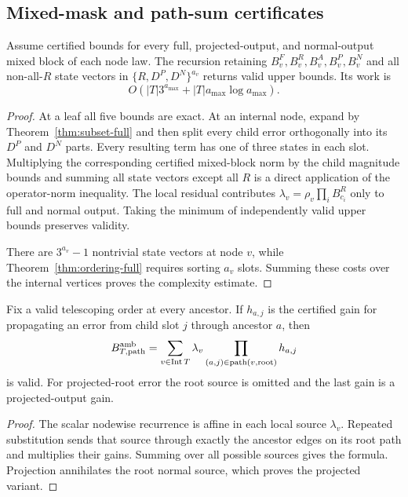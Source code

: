 \subsection{Mixed-mask and path-sum certificates}

\begin{theorem}
\label{thm:dp-full}
Assume certified bounds for every full, projected-output, and normal-output
mixed block of each node law. The recursion retaining
\(B_v^F,B_v^R,B_v^A,B_v^P,B_v^N\) and all non-all-\(R\) state vectors in
\(\{R,D^P,D^N\}^{a_v}\) returns valid upper bounds. Its work is
\[
 O\!\left(|T|3^{a_{\max}}+|T|a_{\max}\log a_{\max}\right).
\]
\end{theorem}

\begin{proof}
At a leaf all five bounds are exact. At an internal node, expand by
Theorem~\ref{thm:subset-full} and then split every child error orthogonally
into its \(D^P\) and \(D^N\) parts. Every resulting term has one of three
states in each slot. Multiplying the corresponding certified mixed-block
norm by the child magnitude bounds and summing all state vectors except
all \(R\) is a direct application of the operator-norm inequality. The
local residual contributes
\(\lambda_v=\rho_v\prod_iB_{c_i}^R\) only to full and normal output. Taking
the minimum of independently valid upper bounds preserves validity.

There are \(3^{a_v}-1\) nontrivial state vectors at node \(v\), while
Theorem~\ref{thm:ordering-full} requires sorting \(a_v\) slots. Summing
these costs over the internal vertices proves the complexity estimate.
\end{proof}

\begin{corollary}
\label{cor:path-full}
Fix a valid telescoping order at every ancestor. If \(h_{a,j}\) is the
certified gain for propagating an error from child slot \(j\) through
ancestor \(a\), then
\[
 B_{T,\rm path}^{\rm amb}
 =\sum_{v\in\operatorname{Int}T}\lambda_v
   \prod_{(a,j)\in\operatorname{path}(v,\operatorname{root})}h_{a,j}
\]
is valid. For projected-root error the root source is omitted and the last
gain is a projected-output gain.
\end{corollary}

\begin{proof}
The scalar nodewise recurrence is affine in each local source
\(\lambda_v\). Repeated substitution sends that source through exactly the
ancestor edges on its root path and multiplies their gains. Summing over
all possible sources gives the formula. Projection annihilates the root
normal source, which proves the projected variant.
\end{proof}

